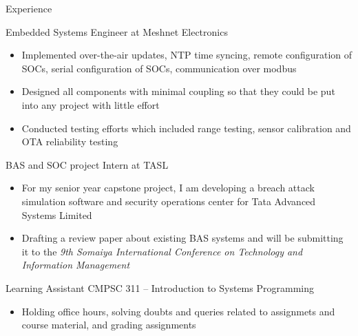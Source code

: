\documentclass{article}
\newlength{\tabin}
\newlength{\secsep}
\newcommand{\lineunder}{\vspace*{-8pt} \\ \hspace*{-6pt} \hrulefill \\ \vspace*{-15pt}}
\newenvironment{tabbedsection}[1]{
	\begin{list}{}{
		\setlength{\itemsep}{0pt}
		\setlength{\labelsep}{0pt}
		\setlength{\labelwidth}{0pt}
		\setlength{\leftmargin}{\tabin}
		\setlength{\rightmargin}{\tabin}
		\setlength{\listparindent}{0pt}
		\setlength{\parsep}{0pt}
		\setlength{\parskip}{0pt}
		\setlength{\partopsep}{0pt}
		\setlength{\topsep}{#1}
	}
	\item[]
}{\end{list}}
\newenvironment{resume_section}[1]{
	\vspace{2\secsep}
	\textsc{\large#1}
	\lineunder
	\begin{tabbedsection}{\secsep}
}{\end{tabbedsection}}
\newenvironment{resume_subsection}[2][]{
	\textbf{#2} \hfill {\footnotesize #1} \hspace{2em}
	\begin{tabbedsection}{0.5\secsep}
}{\end{tabbedsection}}
\newenvironment{subitems}{
	\renewcommand{\labelitemi}{-}
	\begin{itemize}
		\setlength{\labelsep}{1em}
}{\end{itemize}}
\begin{document}
\begin{resume_section}{Experience}

	\begin{resume_subsection}{Embedded Systems Engineer at Meshnet Electronics}
		\begin{subitems}
			\item   Implemented over-the-air updates, NTP time
				syncing, remote configuration of SOCs, serial
				configuration of SOCs, communication over modbus
			\item   Designed all components with minimal coupling
				so that they could be put into any project with
				little effort
			\item   Conducted testing efforts which included range
				testing, sensor calibration and OTA reliability
				testing
		\end{subitems}
	\end{resume_subsection}

	\begin{resume_subsection}{BAS and SOC project Intern at TASL}
		\begin{subitems}
		\item For my senior year capstone project, I am developing a
			breach attack simulation software and security
			operations center for Tata Advanced Systems Limited
		\item Drafting a review paper about existing BAS systems and
			will be submitting it to the \textit{9th Somaiya
			International Conference on Technology and Information
			Management}
		\end{subitems}
	\end{resume_subsection}

	\begin{resume_subsection}{Learning Assistant CMPSC 311 -- Introduction to Systems Programming}
		\begin{subitems}
		\item Holding office hours, solving doubts and queries related to assignmets and course material, and grading assignments
		\end{subitems}
	\end{resume_subsection}


\end{resume_section}
\end{document}
